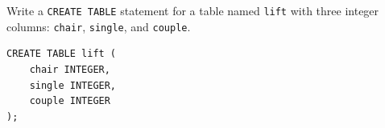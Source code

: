 \begin{blocksection}
\question Write a \lstinline{CREATE TABLE} statement for a table named \lstinline{lift} with three integer columns: \lstinline{chair}, \lstinline{single}, and \lstinline{couple}.

\begin{solution}[2in]
\begin{lstlisting}
CREATE TABLE lift (
    chair INTEGER,
    single INTEGER,
    couple INTEGER
);
\end{lstlisting}
\end{solution}
\end{blocksection}

